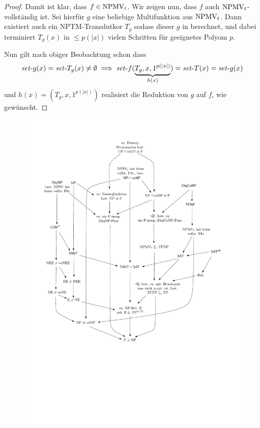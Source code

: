 \begin{proof}
    Damit ist klar, dass $f\in\mathrm{NPMV}_t$.
    Wir zeigen nun, dass $f$ auch $\mathrm{NPMV}_t$-vollständig ist.
    Sei hierfür $g$ eine beliebige Multifunktion aus $\mathrm{NPMV}_t$.
    Dann existiert auch ein NPTM-Transdutkor $T_g$ sodass dieser $g$ in berechnet, und dabei terminiert $T_g(x)$ in $\leq p(|x|)$ vielen Schritten für geeignetes Polyom $p$.

    Nun gilt nach obiger Beobachtung schon dass 
    \[ \mathit{set}\text{-}{g}(x) = \mathit{set}\text{-}{T_g}(x)\neq\emptyset \implies \mathit{set}\text{-}{f}(\underbrace{T_g, x, 1^{p(|x|)}}_{h(x)})=\mathit{set}\text{-}{T}(x)=\mathit{set}\text{-}{g}(x) \]
    und $h(x)=(T_g, x, 1^{p(|x|)})$ realisiert die Reduktion von $g$ auf $f$, wie gewünscht.
\end{proof}

\begin{figure}[p]
    \vspace*{-5cm}
    \includegraphics[page=7]{figures.pdf}
    \vspace*{-3cm}

\end{figure}
